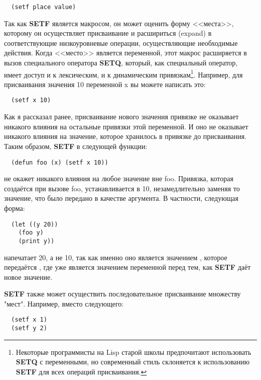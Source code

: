 \begin{lstlisting}
  (setf place value)
\end{lstlisting}

Так как \textbf{SETF} является макросом, он может оценить форму <<места>>, которому он
осуществляет присваивание и расшириться (expand) в соответствующие низкоуровневые
операции, осуществляющие необходимые действия. Когда <<место>> является переменной, этот
макрос расширяется в вызов специального оператора \textbf{SETQ}, который, как специальный
оператор, имеет доступ и к лексическим, и к динамическим привязкам\footnote{Некоторые
  программисты на Lisp старой школы предпочитают использовать \textbf{SETQ} с переменными,
  но современный стиль склоняется к использованию \textbf{SETF} для всех операций
  присваивания.}. Например, для присваивания значения 10 переменной x вы можете написать
это:

\begin{lstlisting}
  (setf x 10)
\end{lstlisting}

Как я рассказал ранее, присваивание нового значения привязке не оказывает никакого влияния
на остальные привязки этой переменной. И оно не оказывает никакого влияния на значение,
которое хранилось в привязке до присваивания. Таким образом, \textbf{SETF} в следующей
функции:

\begin{lstlisting}
  (defun foo (x) (setf x 10))
\end{lstlisting}

не окажет никакого влияния на любое значение вне foo. Привязка, которая создаётся при
вызове foo, устанавливается в 10, незамедлительно заменяя то значение, что было передано в
качестве аргумента. В частности, следующая форма:

\begin{lstlisting}
  (let ((y 20))
    (foo y)
    (print y))
\end{lstlisting}

напечатает 20, а не 10, так как именно оно является значением , которое передаётся
, где уже является значением переменной  перед тем, как \textbf{SETF}
даёт  новое значение.

\textbf{SETF} также может осуществить последовательное присваивание множеству
"мест". Например, вместо следующего:

\begin{lstlisting}
  (setf x 1)
  (setf y 2)
\end{lstlisting}

